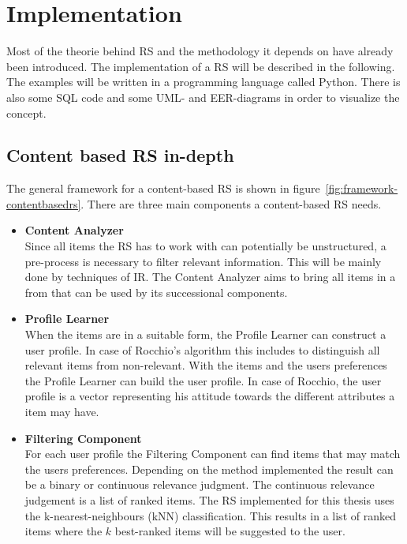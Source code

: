 

\section{Implementation}
Most of the theorie behind RS and the methodology it depends on have already been introduced.
The implementation of a RS will be described in the following.
The examples will be written in a programming language called Python.
There is also some SQL code and some UML- and EER-diagrams in order to visualize the concept.

\subsection{Content based RS in-depth}
\label{sec:implementation-contentbased}
The general framework for a content-based RS is shown in figure~\ref{fig:framework-contentbasedrs}.
There are three main components a content-based RS needs.
\begin{itemize}
    \item \textbf{Content Analyzer}\\
        Since all items the RS has to work with can potentially be unstructured, a pre-process is necessary to filter relevant information.
        This will be mainly done by techniques of IR.
        The Content Analyzer aims to bring all items in a from that can be used by its successional components.
        \citep[p.~75-77]{lops:2011}
    \item \textbf{Profile Learner}\\
        When the items are in a suitable form, the Profile Learner can construct a user profile.
        In case of Rocchio's algorithm this includes to distinguish all relevant items from non-relevant.
        With the items and the users preferences the Profile Learner can build the user profile.
        In case of Rocchio, the user profile is a vector representing his attitude towards the different attributes a item may have.
        \citep[p.~75-77]{lops:2011}
    \item \textbf{Filtering Component}\\
        For each user profile the Filtering Component can find items that may match the users preferences.
        Depending on the method implemented the result can be a binary or continuous relevance judgment.
        The continuous relevance judgement is a list of ranked items.
        \citep[p.~75-77]{lops:2011}
        The RS implemented for this thesis uses the k-nearest-neighbours (kNN) classification.
        This results in a list of ranked items where the $k$ best-ranked items will be suggested to the user.
\end{itemize}


